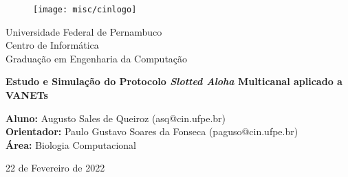 \begin{figure}[!htpb]
	\centering
	\texttt{[image: misc/cinlogo]}
\end{figure}

\vspace{1cm}
\begin{center}
	{Universidade Federal de Pernambuco\\
	Centro de Informática\\
	Graduação em Engenharia da Computação}
\end{center}
\vspace{2cm}
\begin{center}
	\large{\textbf{Estudo e Simulação do Protocolo \emph{Slotted Aloha} Multicanal aplicado a VANETs}}
\end{center}
\vspace{2.5cm}

\begin{center}
    \textbf{Aluno:} Augusto Sales de Queiroz (asq@cin.ufpe.br) \\
    \leavevmode \newline
    \textbf{Orientador:} Paulo Gustavo Soares da Fonseca (paguso@cin.ufpe.br) \\
    \leavevmode \newline
    \textbf{Área:} Biologia Computacional
\end{center}

\vspace{4cm}
\begin{center}
    22 de Fevereiro de 2022
\end{center}

\thispagestyle{empty}